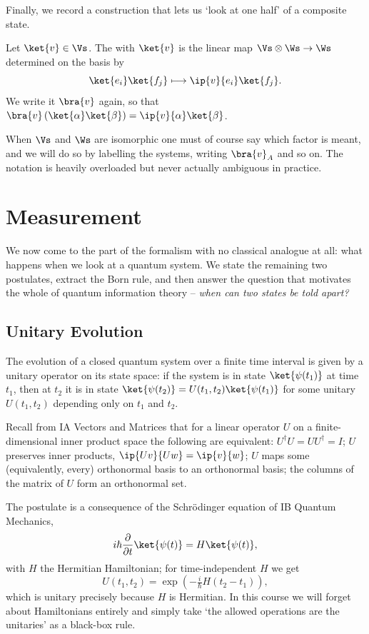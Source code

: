 Finally, we record a construction that lets us `look at one half' of a composite state.

\begin{definition}
	Let $\ket{v} \in \Vs$. The  with $\ket{v}$ is the linear map $\Vs\otimes\Ws \to \Ws$ determined on the basis by
	$$\ket{e_i}\ket{f_j} \longmapsto \ip{v}{e_i}\ket{f_j}.$$
	We write it $\bra{v}$ again, so that $\bra{v}\left(\ket{\alpha}\ket{\beta}\right) = \ip{v}{\alpha}\ket{\beta}$.
\end{definition}

When $\Vs$ and $\Ws$ are isomorphic one must of course say which factor is meant, and we will do so by labelling the systems, writing $\bra{v}_A$ and so on. The notation is heavily overloaded but never actually ambiguous in practice.

\section{Measurement}

We now come to the part of the formalism with no classical analogue at all: what happens when we look at a quantum system. We state the remaining two postulates, extract the Born rule, and then answer the question that motivates the whole of quantum information theory -- \emph{when can two states be told apart?}

\subsection{Unitary Evolution}

\begin{axiom}[Evolution]
	The evolution of a closed quantum system over a finite time interval is given by a unitary operator on its state space: if the system is in state $\ket{\psi(t_1)}$ at time $t_1$, then at $t_2$ it is in state $\ket{\psi(t_2)} = U(t_1,t_2)\ket{\psi(t_1)}$ for some unitary $U(t_1,t_2)$ depending only on $t_1$ and $t_2$.
\end{axiom}

Recall from IA Vectors and Matrices that for a linear operator $U$ on a finite-dimensional inner product space the following are equivalent: $U^\dagger U = UU^\dagger = I$; $U$ preserves inner products, $\ip{Uv}{Uw} = \ip{v}{w}$; $U$ maps some (equivalently, every) orthonormal basis to an orthonormal basis; the columns of the matrix of $U$ form an orthonormal set.

The postulate is a consequence of the Schr\"odinger equation of IB Quantum Mechanics,
$$i\hbar \frac{\partial}{\partial t}\ket{\psi(t)} = H \ket{\psi(t)},$$
with $H$ the Hermitian Hamiltonian; for time-independent $H$ we get
$$U(t_1,t_2) = \exp\!\left(-\tfrac{i}{\hbar}H(t_2-t_1)\right),$$
which is unitary precisely because $H$ is Hermitian. In this course we will forget about Hamiltonians entirely and simply take `the allowed operations are the unitaries' as a black-box rule.

